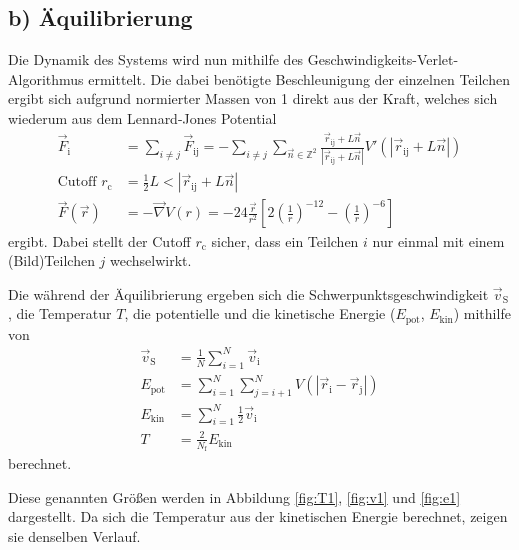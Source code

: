 \FloatBarrier
\subsection*{b) Äquilibrierung}

Die Dynamik des Systems wird nun mithilfe des Geschwindigkeits-Verlet-Algorithmus ermittelt.
Die dabei benötigte Beschleunigung der einzelnen Teilchen ergibt sich aufgrund normierter Massen von 1
direkt aus der Kraft, welches sich wiederum aus dem Lennard-Jones Potential
\begin{align*}
    \vec{F}_\text{i}
    &= \sum_{i \neq j} \vec{F}_\text{ij}
    = - \sum_{i \neq j} \sum_{\vec{n} \in \mathbb{Z}^2}
        \frac{\vec{r}_\text{ij} + L \vec{n}}{\left|\vec{r}_\text{ij} + L \vec{n}\right|}
        V'\left(\left|\vec{r}_\text{ij} + L \vec{n}\right|\right) \\
    \text{Cutoff } r_\text{c}
    &= \frac{1}{2} L < \left|\vec{r}_\text{ij} + L \vec{n}\right| \\
    \vec{F}\!\left(\vec{r}\right)
    &= - \vec{\nabla} V\left(r\right)
    = - 24 \frac{\vec{r}}{r^2}
        \left[2 \left(\frac{1}{r}\right)^{-12} - \left(\frac{1}{r}\right)^{-6}\right]
\end{align*}
ergibt.
Dabei stellt der Cutoff $r_\text{c}$ sicher, dass ein Teilchen $i$ nur einmal mit einem (Bild)Teilchen $j$
wechselwirkt.

Die während der Äquilibrierung ergeben sich die Schwerpunktsgeschwindigkeit $\vec{v}_\text{S}$,
die Temperatur $T$, die potentielle und die kinetische Energie
($E_\text{pot}$, $E_\text{kin}$) mithilfe von
\begin{align*}
    \vec{v}_\text{S} &= \frac{1}{N} \sum_{i=1}^N \vec{v}_\text{i} \\
    E_\text{pot} &= \sum_{i=1}^N \sum_{j=i+1}^N
        V\!\left(\left|\vec{r}_\text{i} - \vec{r}_\text{j}\right|\right) \\
    E_\text{kin} &= \sum_{i=1}^N \frac{1}{2} \vec{v}_\text{i} \\
    T &= \frac{2}{N_\text{f}} E_\text{kin}
\end{align*}
berechnet.

Diese genannten Größen werden in Abbildung \ref{fig:T1}, \ref{fig:v1} und \ref{fig:e1}
dargestellt. Da sich die Temperatur aus der kinetischen Energie berechnet, zeigen sie
denselben Verlauf.

